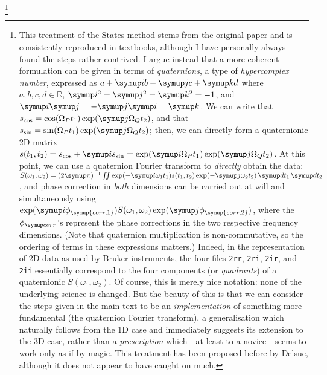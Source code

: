\footnote{This treatment of the States method stems from the original paper\autocite{States1982JMR} and is consistently reproduced in textbooks, although I have personally always found the steps rather contrived.
I argue instead that a more coherent formulation can be given in terms of \textit{quaternions}, a type of \textit{hypercomplex number}, expressed as $a + \mi b + \mj c + \mk d$ where $a, b, c, d \in \mathbb{R}$, $\mi^2 = \mj^2 = \mk^2 = -1$, and $\mi\mj = -\mj\mi = \mk$.
    We can write that $s_\text{cos} = \cos(\Omega_P t_1)\exp(\mj\Omega_Q t_2)$, and that $s_\text{sin} = \sin(\Omega_P t_1)\exp(\mj\Omega_Q t_2)$; then, we can directly form a quaternionic 2D matrix $s(t_1, t_2) = s_\text{cos} + \mi s_\text{sin} = \exp(\mi\Omega_P t_1)\exp(\mj\Omega_Q t_2)$.
    At this point, we can use a quaternion Fourier transform to \textit{directly} obtain the data: $S(\omega_1, \omega_2) = (2\cpi)^{-1}\iint \exp(-\mi\omega_1 t_1)s(t_1, t_2) \exp(-\mj\omega_2 t_2)\,\md t_1\,\md t_2$, and phase correction in \textit{both} dimensions can be carried out at will and simultaneously using
    $\exp(\mi \phi_{\symup{corr,1}})S(\omega_1, \omega_2) \exp(\mj\phi_{\symup{corr,2}})$, where the $\phicorr$'s represent the phase corrections in the two respective frequency dimensions.
    (Note that quaternion multiplication is non-commutative, so the ordering of terms in these expressions matters.)
    Indeed, in the representation of 2D data as used by Bruker instruments, the four files \texttt{2rr}, \texttt{2ri}, \texttt{2ir}, and \texttt{2ii} essentially correspond to the four components (or \textit{quadrants}) of a quaternionic $S(\omega_1, \omega_2)$.
    Of course, this is merely nice notation: none of the underlying science is changed.
    But the beauty of this is that we can consider the steps given in the main text to be an \textit{implementation} of something more fundamental (the quaternion Fourier transform), a generalisation which naturally follows from the 1D case and immediately suggests its extension to the 3D case, rather than a \textit{prescription} which---at least to a novice---seems to work only as if by magic.
    This treatment has been proposed before by Delsuc\autocite{Delsuc1988JMR}, although it does not appear to have caught on much.
}

